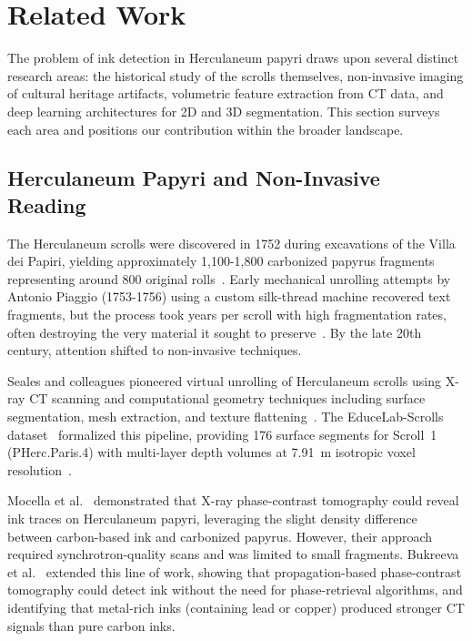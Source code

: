 \section{Related Work}
\label{sec:related_work}

The problem of ink detection in Herculaneum papyri draws upon several distinct research areas: the historical study of the scrolls themselves, non-invasive imaging of cultural heritage artifacts, volumetric feature extraction from CT data, and deep learning architectures for 2D and 3D segmentation. This section surveys each area and positions our contribution within the broader landscape.

\subsection{Herculaneum Papyri and Non-Invasive Reading}

The Herculaneum scrolls were discovered in 1752 during excavations of the Villa dei Papiri, yielding approximately 1,100-1,800 carbonized papyrus fragments representing around 800 original rolls~\cite{janko2002herculaneum}. Early mechanical unrolling attempts by Antonio Piaggio (1753-1756) using a custom silk-thread machine recovered text fragments, but the process took years per scroll with high fragmentation rates, often destroying the very material it sought to preserve~\cite{parsons1936, seales2023neh}. By the late 20th century, attention shifted to non-invasive techniques.

Seales and colleagues pioneered virtual unrolling of Herculaneum scrolls using X-ray CT scanning and computational geometry techniques including surface segmentation, mesh extraction, and texture flattening~\cite{seales2005digital}. The EduceLab-Scrolls dataset~\cite{seales2023educelab} formalized this pipeline, providing 176 surface segments for Scroll~1 (PHerc.Paris.4) with multi-layer depth volumes at 7.91~\textmu m isotropic voxel resolution~\cite{scrollprize2023data}.

Mocella et al.~\cite{mocella2015revealing} demonstrated that X-ray phase-contrast tomography could reveal ink traces on Herculaneum papyri, leveraging the slight density difference between carbon-based ink and carbonized papyrus. However, their approach required synchrotron-quality scans and was limited to small fragments. Bukreeva et al.~\cite{bukreeva2016virtual} extended this line of work, showing that propagation-based phase-contrast tomography could detect ink without the need for phase-retrieval algorithms, and identifying that metal-rich inks (containing lead or copper) produced stronger CT signals than pure carbon inks.

